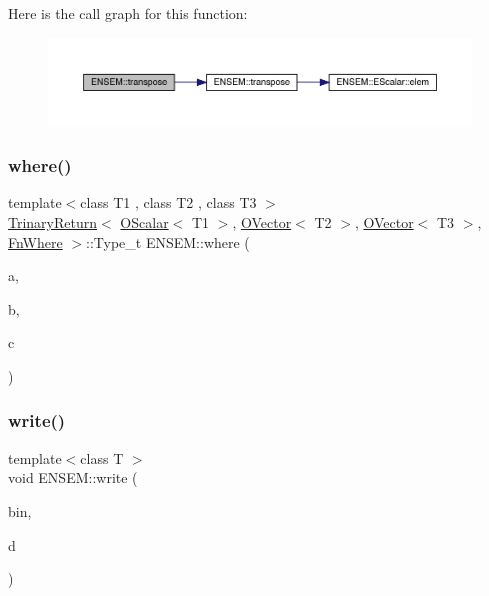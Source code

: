 Here is the call graph for this function\+:\nopagebreak
\begin{figure}[H]
\begin{center}
\leavevmode
\includegraphics[width=350pt]{da/d59/group__obsvector_ga9c3c97af68e1cfa2eb913c66fa87188b_cgraph}
\end{center}
\end{figure}
\mbox{\label{group__obsvector_ga0995058bdfadea43373e7142180780a1}} 
\subsubsection{\texorpdfstring{where()}{where()}}
{\footnotesize\ttfamily template$<$class T1 , class T2 , class T3 $>$ \\
\mbox{\hyperlink{structENSEM_1_1TrinaryReturn}{Trinary\+Return}}$<$ \mbox{\hyperlink{classENSEM_1_1OScalar}{O\+Scalar}}$<$ T1 $>$, \mbox{\hyperlink{classENSEM_1_1OVector}{O\+Vector}}$<$ T2 $>$, \mbox{\hyperlink{classENSEM_1_1OVector}{O\+Vector}}$<$ T3 $>$, \mbox{\hyperlink{structENSEM_1_1FnWhere}{Fn\+Where}} $>$\+::Type\+\_\+t E\+N\+S\+E\+M\+::where (\begin{DoxyParamCaption}\item[{const \mbox{\hyperlink{classENSEM_1_1OScalar}{O\+Scalar}}$<$ T1 $>$ \&}]{a,  }\item[{const \mbox{\hyperlink{classENSEM_1_1OVector}{O\+Vector}}$<$ T2 $>$ \&}]{b,  }\item[{const \mbox{\hyperlink{classENSEM_1_1OVector}{O\+Vector}}$<$ T3 $>$ \&}]{c }\end{DoxyParamCaption})\hspace{0.3cm}{\ttfamily [inline]}}

\mbox{\label{group__obsvector_gab76c1efedcd0fb2cbe27c2c995c6d110}} 
\subsubsection{\texorpdfstring{write()}{write()}}
{\footnotesize\ttfamily template$<$class T $>$ \\
void E\+N\+S\+E\+M\+::write (\begin{DoxyParamCaption}\item[{\mbox{\hyperlink{classADATIO_1_1BinaryWriter}{A\+D\+A\+T\+I\+O\+::\+Binary\+Writer}} \&}]{bin,  }\item[{const \mbox{\hyperlink{classENSEM_1_1OVector}{O\+Vector}}$<$ T $>$ \&}]{d }\end{DoxyParamCaption})\hspace{0.3cm}{\ttfamily [inline]}}



